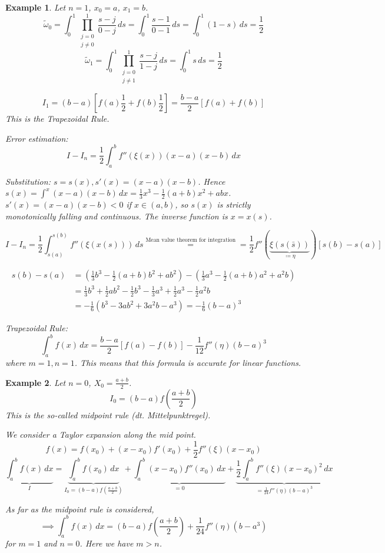 \documentclass{article}
\newtheorem{example}{Example}
\begin{document}
\begin{example}
  Let $n=1$, $x_0 = a$, $x_1 = b$.
  \[ \tilde \omega_0 = \int_0^1 \prod_{\substack{j = 0 \\ j \neq 0}}^1 \frac{s - j}{0 - j} \, ds = \int_0^1 \frac{s-1}{0-1} \, ds = \int_0^1 (1 - s) \, ds = \frac12 \]
  \[ \tilde \omega_1 = \int_0^1 \prod_{\substack{j = 0 \\ j \neq 1}}^1 \frac{s - j}{1 - j} \, ds = \int_0^1 s \, ds = \frac12 \]

  \[ I_1 = (b - a) \left[ f(a) \frac12 + f(b) \frac12 \right] = \frac{b - a}{2} \left[f(a) + f(b)\right] \]
  This is the \emph{Trapezoidal Rule}.

  Error estimation:
  \[ I - I_n = \frac12 \int_a^b f''(\xi(x)) (x - a)(x - b) \, dx \]

  Substitution: $s = s(x), s'(x) = (x-a)(x-b)$.
  Hence $s(x) = \int^x (x-a)(x-b) \, dx = \frac13 x^3 - \frac12 (a + b) x^2 + abx$.
  $s'(x) = (x - a)(x - b) < 0$ if $x \in (a,b)$, so $s(x)$ is strictly monotonically falling and continuous.
  The inverse function is $x = x(s)$.

  \[ I - I_n = \frac12 \int_{s(a)}^{s(b)} f''(\xi(x(s))) \, ds \stackrel{\text{Mean value theorem for integration}}{=} = \frac12 f''(\underbrace{\xi(s(\bar s))}_{\coloneqq \eta}) [s(b) - s(a)] \]

  \begin{align*}
    s(b) - s(a) &= \left(\frac13 b^3 - \frac12 (a + b) b^2 + ab^2\right) - \left(\frac13 a^3 - \frac12 (a + b) a^2 + a^2 b\right) \\
      &= \frac13 b^3 + \frac12 ab^2 - \frac12 b^3 - \frac13 a^3 + \frac12 a^3 - \frac12 a^2 b \\
      &= -\frac16 \left( b^3 - 3ab^2 + 3a^2b - a^3 \right) = -\frac16 (b - a)^3
  \end{align*}

  Trapezoidal Rule:
  \[ \int_a^b f(x) \, dx = \frac{b-a}{2} [f(a) - f(b)] - \frac1{12} f''(\eta) (b - a)^3 \]
  where $m=1, n=1$. This means that this formula is accurate for linear functions.
\end{example}

\begin{example}
  Let $n=0$, $X_0 = \frac{a+b}{2}$.
  \[ I_0 = (b - a) f\left(\frac{a+b}{2}\right) \]
  This is the so-called midpoint rule (dt. Mittelpunktregel).

  We consider a Taylor expansion along the mid point. %
  \[ f(x) = f(x_0) + (x - x_0) f'(x_0) + \frac12 f''(\xi) (x - x_0) \]
  \[ \underbrace{\int_a^b f(x) \, dx}_{I} = \underbrace{\int_a^b f(x_0) \, dx}_{I_0 = (b - a) f(\frac{a+b}{2})} + \underbrace{\int_a^b (x - x_0) f''(x_0) \, dx}_{=0} + \underbrace{\frac12 \int_a^b f''(\xi) (x - x_0)^2 \, dx}_{= \frac1{24} f''(\eta) (b - a)^3} \]

  As far as the midpoint rule is considered,
  \[ \implies \int_a^b f(x) \, dx = (b - a)f\left(\frac{a + b}{2}\right) + \frac1{24} f''(\eta) (b - a^3) \]
  for $m=1$ and $n=0$. Here we have $m > n$.
\end{example}
\end{document}
